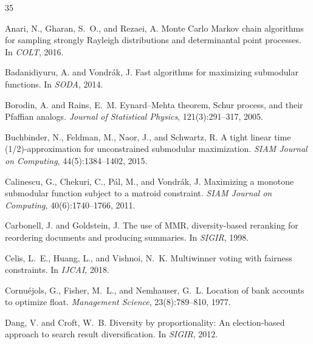 \documentclass[11pt]{article}
\begin{document}


\begin{thebibliography}{35}

Anari, N., Gharan, S.~O., and Rezaei, A.
\newblock Monte {C}arlo {M}arkov chain algorithms for sampling strongly
  {R}ayleigh distributions and determinantal point processes.
\newblock In \emph{COLT}, 2016.

Badanidiyuru, A. and Vondr{\'a}k, J.
\newblock Fast algorithms for maximizing submodular functions.
\newblock In \emph{SODA}, 2014.

Borodin, A. and Rains, E.~M.
\newblock Eynard--Mehta theorem, {S}chur process, and their {P}faffian analogs.
\newblock \emph{Journal of Statistical Physics}, 121(3):291--317, 2005.

Buchbinder, N., Feldman, M., Naor, J., and Schwartz, R.
\newblock A tight linear time (1/2)-approximation for unconstrained submodular maximization.
\newblock \emph{SIAM Journal on Computing}, 44(5):1384--1402, 2015.

Calinescu, G., Chekuri, C., P{\'a}l, M., and Vondr{\'a}k, J.
\newblock Maximizing a monotone submodular function subject to a matroid
  constraint.
\newblock \emph{SIAM Journal on Computing}, 40(6):1740--1766, 2011.

Carbonell, J. and Goldstein, J.
\newblock The use of {MMR}, diversity-based reranking for reordering documents
  and producing summaries.
\newblock In \emph{SIGIR}, 1998.

Celis, L.~E., Huang, L., and Vishnoi, N.~K.
\newblock Multiwinner voting with fairness constraints.
\newblock In \emph{IJCAI}, 2018.

Cornu{\'e}jols, G., Fisher, M.~L., and Nemhauser, G.~L.
\newblock Location of bank accounts to optimize float.
\newblock \emph{Management Science}, 23(8):789--810, 1977.

Dang, V. and Croft, W.~B.
\newblock Diversity by proportionality: An election-based approach to search
  result diversification.
\newblock In \emph{SIGIR}, 2012.


\end{thebibliography}
\end{document}

